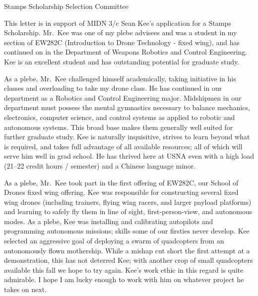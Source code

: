 \documentclass[12pt]{wrceletter}
\date{\today}
\begin{document}
\begin{letter}{%
Stamps Scholarship Selection Committee}

\opening{}
\raggedright 
\setlength{\parindent}{15pt}

This letter is in support of MIDN 3/c Sean Kee's application for a Stamps Scholarship. Mr.~Kee was one of my plebe advisees and was a student in my section of EW282C (Introduction to Drone Technology - fixed wing), and has continued on in the Department of Weapons Robotics and Control Engineering. Kee is an excellent student and has outstanding potential for graduate study. 

As a plebe, Mr.~Kee challenged himself academically, taking initiative in his classes and overloading to take my drone class. He has continued in our department as a Robotics and Control Engineering major. Midshipmen in our department must possess the mental gymnastics necessary to balance mechanics, electronics, computer science, and control systems as applied to robotic and autonomous systems. This broad base makes them generally well suited for further graduate study. Kee is naturally inquisitive, strives to learn beyond what is required, and takes full advantage of all available resources; all of which will serve him well in grad school. He has thrived here at USNA even with a high load (21--22 credit hours / semester) and a Chinese language minor.

As a plebe, Mr.~Kee took part in the first offering of EW282C, our School of Drones fixed wing offering.  Kee was responsible for constructing several fixed wing drones (including trainers, flying wing racers, and larger payload platforms) and learning to safely fly them in line of sight, first-person-view, and autonomous modes. As a plebe, Kee was installing and calibrating autopilots and programming autonomous missions; skills some of our firsties never develop. Kee selected an aggressive goal of deploying a swarm of quadcopters from an autonomously flown mothership. While a mishap cut short the first attempt at a demonstration, this has not deterred Kee; with another crop of small quadcopters available this fall we hope to try again. Kee's work ethic in this regard is quite admirable. I hope I am lucky enough to work with him on whatever project he takes on next.

\closing{~} %

\end{letter}
\end{document}
